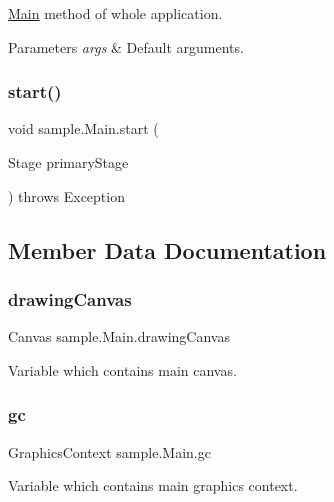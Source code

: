 \hyperlink{classsample_1_1_main}{Main} method of whole application. 
\begin{DoxyParams}{Parameters}
{\em args} & Default arguments. \\
\hline
\end{DoxyParams}
\mbox{\label{classsample_1_1_main_a64ba37c898ca967654307543954cd09d}} 
\subsubsection{\texorpdfstring{start()}{start()}}
{\footnotesize\ttfamily void sample.\+Main.\+start (\begin{DoxyParamCaption}\item[{Stage}]{primary\+Stage }\end{DoxyParamCaption}) throws Exception}



\subsection{Member Data Documentation}
\mbox{\label{classsample_1_1_main_abc6b5d52c470cad08159bc670d3cf91b}} 
\subsubsection{\texorpdfstring{drawing\+Canvas}{drawingCanvas}}
{\footnotesize\ttfamily Canvas sample.\+Main.\+drawing\+Canvas}

Variable which contains main canvas. \mbox{\label{classsample_1_1_main_a179ba2f59a5607db1529380c65a71d7d}} 
\subsubsection{\texorpdfstring{gc}{gc}}
{\footnotesize\ttfamily Graphics\+Context sample.\+Main.\+gc}

Variable which contains main graphics context. \mbox{\label{classsample_1_1_main_adf52f45996c28f1b8d69b9e7d3694338}} 
